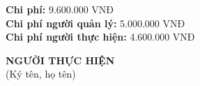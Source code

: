 {\begin{minipage}{\textwidth}
    \vspace{0.5cm}
    \noindent \textbf{Chi phí:} 9.600.000 VNĐ \\
    \noindent \textbf{Chi phí người quản lý:} 5.000.000 VNĐ \\
    \noindent \textbf{Chi phí người thực hiện:} 4.600.000 VNĐ \\
    \vspace{1cm}
    \begin{flushleft}
        \hspace{8cm} \textbf{NGƯỜI THỰC HIỆN} \\
        \hspace{8.8cm} (Ký tên, họ tên) \\
        \vspace{1cm}
    \end{flushleft}
    \end{minipage}
}
% 
